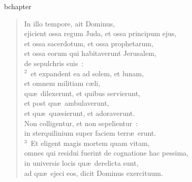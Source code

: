 bchapter\begin{flushleft}\begin{verse}\vspace{-19pt}In illo tempore, ait Dominus,\\ ejicient ossa regum Juda, et ossa principum ejus,\\ et ossa sacerdotum, et ossa prophetarum,\\ et ossa eorum qui habitaverunt Jerusalem,\\ de sepulchris suis~:\\
${}^{2}$~et expandent ea ad solem, et lunam,\\ et omnem militiam c\ae li,\\ qu\ae\ dilexerunt, et quibus servierunt,\\ et post qu\ae\ ambulaverunt,\\ et qu\ae\ qu\ae sierunt, et adoraverunt.\\ Non colligentur, et non sepelientur~:\\ in sterquilinium super faciem terr\ae\ erunt.\\
${}^{3}$~Et eligent magis mortem quam vitam,\\ omnes qui residui fuerint de cognatione hac pessima,\\ in universis locis qu\ae\ derelicta sunt,\\ ad qu\ae\ ejeci eos, dicit Dominus exercituum.\end{verse}\end{flushleft}


